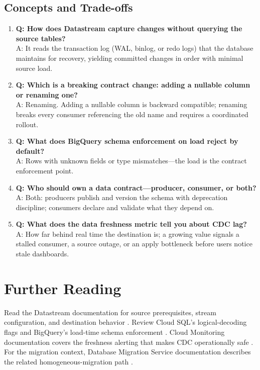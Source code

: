 \subsection{Concepts and Trade-offs}
\begin{enumerate}
    \item \textbf{Q: How does Datastream capture changes without querying the source tables?}\\
    A: It reads the transaction log (WAL, binlog, or redo logs) that the database maintains for recovery, yielding committed changes in order with minimal source load.

    \item \textbf{Q: Which is a breaking contract change: adding a nullable column or renaming one?}\\
    A: Renaming. Adding a nullable column is backward compatible; renaming breaks every consumer referencing the old name and requires a coordinated rollout.

    \item \textbf{Q: What does BigQuery schema enforcement on load reject by default?}\\
    A: Rows with unknown fields or type mismatches---the load is the contract enforcement point.

    \item \textbf{Q: Who should own a data contract---producer, consumer, or both?}\\
    A: Both: producers publish and version the schema with deprecation discipline; consumers declare and validate what they depend on.

    \item \textbf{Q: What does the data freshness metric tell you about CDC lag?}\\
    A: How far behind real time the destination is; a growing value signals a stalled consumer, a source outage, or an apply bottleneck before users notice stale dashboards.
\end{enumerate}

\section{Further Reading}
Read the Datastream documentation for source prerequisites, stream configuration, and destination behavior \cite{googleclouddatastreamdocs}. Review Cloud SQL's logical-decoding flags \cite{googlecloudsqldocs} and BigQuery's load-time schema enforcement \cite{googlecloudbigquerydocs}. Cloud Monitoring documentation covers the freshness alerting that makes CDC operationally safe \cite{googlecloudmonitoringdocs}. For the migration context, Database Migration Service documentation describes the related homogeneous-migration path \cite{googleclouddmsdocs}.

